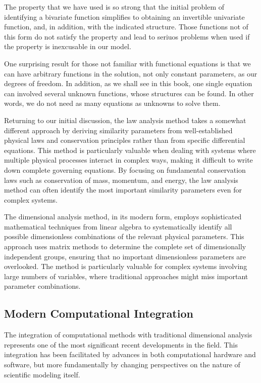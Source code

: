 \documentclass[
	11pt, %
	fleqn, %
	a4paper, %
]{LegrandOrangeBook}
\begin{document}
The property that we have used is so strong that the initial problem of identifying a bivariate function simplifies to obtaining an invertible univariate function, and, in addition, with the indicated structure. Those functions not of this form do not satisfy the property and lead to seriuos problems when used if the property is inexcusable in our model.

One surprising result for those not familiar with functional equations is that we can have arbitrary functions in the solution, not only constant parameters, as our degrees of freedom. In addition, as we shall see in this book, one single equation can involved several unknown functions, whose structures can be found. In other words, we do not need as many equations as unknowns to solve them.


Returning to our initial discussion, the law analysis method takes a somewhat different approach by deriving similarity parameters from well-established physical laws and conservation principles rather than from specific differential equations. This method is particularly valuable when dealing with systems where multiple physical processes interact in complex ways, making it difficult to write down complete governing equations. By focusing on fundamental conservation laws such as conservation of mass, momentum, and energy, the law analysis method can often identify the most important similarity parameters even for complex systems.

The dimensional analysis method, in its modern form, employs sophisticated mathematical techniques from linear algebra to systematically identify all possible dimensionless combinations of the relevant physical parameters. This approach uses matrix methods to determine the complete set of dimensionally independent groups, ensuring that no important dimensionless parameters are overlooked. The method is particularly valuable for complex systems involving large numbers of variables, where traditional approaches might miss important parameter combinations.

\subsection{Modern Computational Integration}

The integration of computational methods with traditional dimensional analysis represents one of the most significant recent developments in the field. This integration has been facilitated by advances in both computational hardware and software, but more fundamentally by changing perspectives on the nature of scientific modeling itself.
\end{document}
